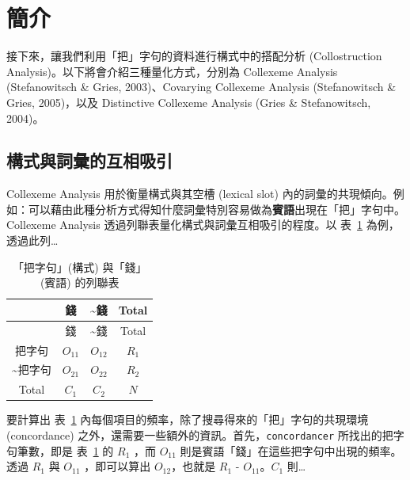 \hypertarget{ux7c21ux4ecb}{%
\section{簡介}\label{ux7c21ux4ecb}}

接下來，讓我們利用「把」字句的資料進行構式中的搭配分析 (Collostruction
Analysis)。以下將會介紹三種量化方式，分別為 Collexeme Analysis
(Stefanowitsch \& Gries, 2003)、Covarying Collexeme Analysis
(Stefanowitsch \& Gries, 2005)，以及 Distinctive Collexeme Analysis
(Gries \& Stefanowitsch, 2004)。

\hypertarget{ux69cbux5f0fux8207ux8a5eux5f59ux7684ux4e92ux76f8ux5438ux5f15}{%
\subsection{構式與詞彙的互相吸引}\label{ux69cbux5f0fux8207ux8a5eux5f59ux7684ux4e92ux76f8ux5438ux5f15}}

Collexeme Analysis 用於衡量構式與其空槽 (lexical slot)
內的詞彙的共現傾向。例如：可以藉由此種分析方式得知什麼詞彙特別容易做為\textbf{賓語}出現在「把」字句中。Collexeme
Analysis 透過列聯表量化構式與詞彙互相吸引的程度。以
表~\ref{tbl:collexeme-analysis1} 為例，透過此列\ldots{}

\hypertarget{tbl:collexeme-analysis1}{}
\begin{longtable}[]{@{}cccc@{}}
\caption{\label{tbl:collexeme-analysis1}「把字句」(構式) 與「錢」(賓語)
的列聯表}\tabularnewline
\toprule()
& 錢 & \textasciitilde 錢 & Total \\
\midrule()
\endfirsthead
\toprule()
& 錢 & \textasciitilde 錢 & Total \\
\midrule()
\endhead
把字句 & \(O_{11}\) & \(O_{12}\) & \(R_{1}\) \\
\textasciitilde 把字句 & \(O_{21}\) & \(O_{22}\) & \(R_{2}\) \\
Total & \(C_{1}\) & \(C_{2}\) & \(N\) \\
\bottomrule()
\end{longtable}

要計算出 表~\ref{tbl:collexeme-analysis1}
內每個項目的頻率，除了搜尋得來的「把」字句的共現環境 (concordance)
之外，還需要一些額外的資訊。首先，\texttt{concordancer}
所找出的把字句筆數，即是 表~\ref{tbl:collexeme-analysis1} 的 \(R_{1}\)
，而 \(O_{11}\) 則是賓語「錢」在這些把字句中出現的頻率。透過 \(R_{1}\)
與 \(O_{11}\) ，即可以算出 \(O_{12}\)，也就是 \(R_{1}\) -
\(O_{11}\)。\(C_{1}\) 則\ldots{}

